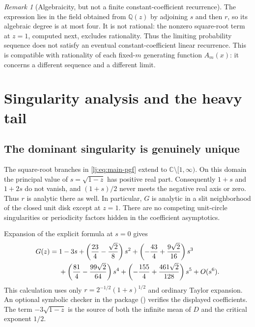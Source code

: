 \documentclass[11pt,a4paper]{article}
\theoremstyle{definition}\newaliascnt{definition}{theorem}
\theoremstyle{remark}\newaliascnt{remark}{theorem}
\newtheorem{remark}[remark]{Remark}
\begin{document}
\begin{remark}[Algebraicity, but not a finite constant-coefficient recurrence]
The expression lies in the field obtained from $\mathbb Q(z)$ by adjoining
$s$ and then $r$, so its algebraic degree is at most four. It is not
rational: the nonzero square-root term at $z=1$, computed next, excludes
rationality. Thus the limiting probability sequence does not satisfy an
eventual constant-coefficient linear recurrence. This is compatible with
rationality of each fixed-$m$ generating function $A_m(x)$: it concerns a
different sequence and a different limit.
\end{remark}

\section{Singularity analysis and the heavy tail}
\label{lj:sec:singularity}

\subsection{The dominant singularity is genuinely unique}
The square-root branches in \eqref{lj:eq:main-pgf} extend to
$\mathbb C\setminus[1,\infty)$. On this domain the principal value of
$s=\sqrt{1-z}$ has positive real part. Consequently $1+s$ and $1+2s$
do not vanish, and $(1+s)/2$ never meets the negative real axis or zero.
Thus $r$ is analytic there as well. In particular, $G$ is analytic in a
slit neighborhood of the closed unit disk except at $z=1$.
There are no competing unit-circle singularities or periodicity factors
hidden in the coefficient asymptotics.

Expansion of the explicit formula at $s=0$ gives
\begin{align}
 G(z)={}&1-3s
 +\left(\frac{23}{4}-\frac{\sqrt2}{8}\right)s^2
 +\left(-\frac{43}{4}+\frac{9\sqrt2}{16}\right)s^3\notag\\
 &+\left(\frac{81}{4}-\frac{99\sqrt2}{64}\right)s^4
 +\left(-\frac{155}{4}+\frac{461\sqrt2}{128}\right)s^5
 +O(s^6).
 \label{lj:eq:singular-expansion}
\end{align}
This calculation uses only
$r=2^{-1/2}(1+s)^{1/2}$ and ordinary Taylor expansion. An optional
symbolic checker in the package
() verifies the displayed
coefficients.
The term $-3\sqrt{1-z}$ is the source of both the infinite mean of $D$
and the critical exponent $1/2$.
\end{document}
